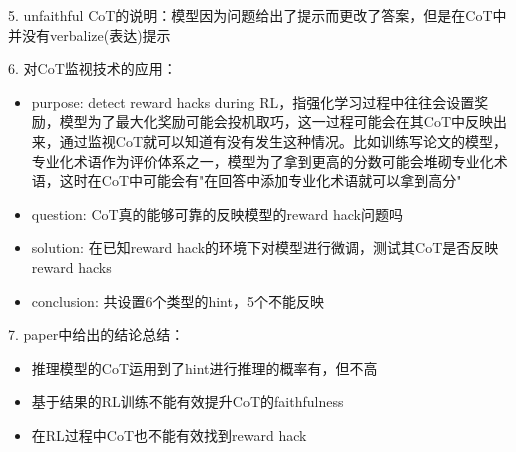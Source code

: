 \documentclass[a4paper,12pt]{article}
\begin{document}
5. unfaithful CoT的说明：模型因为问题给出了提示而更改了答案，但是在CoT中并没有verbalize(表达)提示

6. 对CoT监视技术的应用：
\begin{itemize}
    \item purpose: detect reward hacks during RL，指强化学习过程中往往会设置奖励，模型为了最大化奖励可能会投机取巧，这一过程可能会在其CoT中反映出来，通过监视CoT就可以知道有没有发生这种情况。比如训练写论文的模型，专业化术语作为评价体系之一，模型为了拿到更高的分数可能会堆砌专业化术语，这时在CoT中可能会有"在回答中添加专业化术语就可以拿到高分"
    \item question: CoT真的能够可靠的反映模型的reward hack问题吗
    \item solution: 在已知reward hack的环境下对模型进行微调，测试其CoT是否反映reward hacks
    \item conclusion: 共设置6个类型的hint，5个不能反映
\end{itemize}

7. paper中给出的结论总结：
\begin{itemize}
    \item 推理模型的CoT运用到了hint进行推理的概率有，但不高
    \item 基于结果的RL训练不能有效提升CoT的faithfulness
    \item 在RL过程中CoT也不能有效找到reward hack
\end{itemize}
\end{document}
